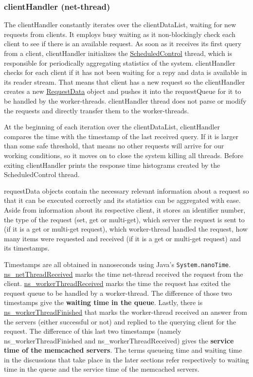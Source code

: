 \documentclass[11pt,a4paper]{article}
\begin{document}
\subsubsection{clientHandler (net-thread)} \label{sec:ov-netthread}
The clientHandler constantly iterates over the clientDataList, waiting for new requests from clients. It employs busy waiting as it non-blockingly check each client to see if there is an available request. As soon as it receives its first query from a client, clientHandler initializes the \underline{ScheduledControl} thread, which is responsible for periodically aggregating statistics of the system. clientHandler checks for each client if it has not been waiting for a repy and data is available in its reader stream. That means that client has a new request so the clientHandler creates a new \underline{RequestData} object and pushes it into the requestQueue for it to be handled by the worker-threads. clientHandler thread does not parse or modify the requests and directly transfer them to the worker-threads.
\par
At the beginning of each iteration over the clientDataList, clientHandler compares the time with the timestamp of the last received query. If it is larger than some safe threshold, that means no other requests will arrive for our working conditions, so it moves on to close the system killing all threads. Before exiting clientHandler prints the response time histograms created by the ScheduledControl thread.
\par
requestData objects contain the necessary relevant information about a request so that it can be executed correctly and its statistics can be aggregated with ease. Aside from information about its respective client, it stores an identifier number, the type of the request (set, get or multi-get), which server the request is sent to (if it is a get or multi-get request), which worker-thread handled the request, how many items were requested and received (if it is a get or multi-get request) and its timestamps.
\par
Timestamps are all obtained in nanoseconds using Java's \texttt{System.nanoTime}. \underline{ns\_netThreadReceived} marks the time net-thread received the request from the client. \underline{ns\_workerThreadReceived} marks the time the request has exited the request queue to be handled by a worker-thread. The difference of those two timestamps give the \textbf{waiting time in the queue}. Lastly, there is \underline{ns\_workerThreadFinished} that marks the worker-thread received an answer from the servers (either successful or not) and replied to the querying client for the request. The difference of this last two timestamps (namely ns\_workerThreadFinished and ns\_workerThreadReceived) gives the \textbf{service time of the memcached servers}. The terms queueing time and waiting time in the discussions that take place in the later sections refer respectively to waiting time in the queue and the service time of the memcached servers.
\end{document}

